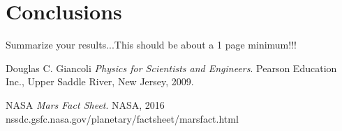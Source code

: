 \documentclass[11pt]{article}
\begin{document}
\section{Conclusions}
\noindent Summarize your results...This should be about a 1 page minimum!!!




\begin{thebibliography}{99}

Douglas C. Giancoli
\textit{Physics for Scientists and Engineers}. 
Pearson Education Inc., Upper Saddle River, New Jersey, 2009.

NASA
\textit{Mars Fact Sheet}. 
NASA, 2016
nssdc.gsfc.nasa.gov/planetary/factsheet/marsfact.html

\end{thebibliography}
\end{document}
